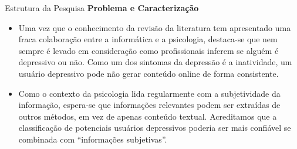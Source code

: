\documentclass[aspectratio=169,10pt,xcolor={dvipsnames}]{beamer}
\begin{document}
\begin{frame}{Estrutura da Pesquisa}{}
  \textbf{\large Problema e Caracterização}

  \begin{block}{}
    \begin{itemize}
      \item Uma vez que o conhecimento da revisão da literatura tem apresentado uma fraca colaboração entre a informática e a psicologia, destaca-se que nem sempre é levado em consideração como profissionais inferem se alguém é depressivo ou não. Como um dos sintomas da depressão é a inatividade, um usuário depressivo pode não gerar conteúdo online de forma consistente. 
    
      \item Como o contexto da psicologia lida regularmente com a subjetividade da informação, espera-se que informações relevantes podem ser extraídas de outros métodos, em vez de apenas conteúdo textual. Acreditamos que a classificação de potenciais usuários depressivos poderia ser mais confiável se combinada com ``informações subjetivas''.
    \end{itemize}
  \end{block}

\end{frame}
\end{document}
